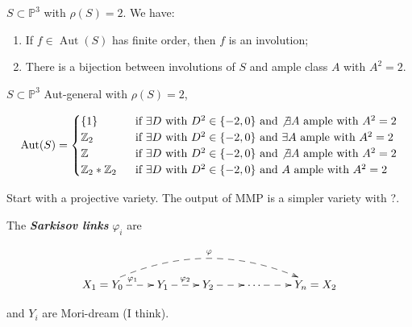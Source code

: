 \begin{proposition}
\label{proposition-paiva-2}
$S \subset \mathbb{P}^3$ with $\rho(S)=2$. We
have:
\begin{enumerate}
\item  If $f \in \operatorname{Aut}(S)$ has
finite order, then $f$ is an involution;
\item There is a bijection between
involutions of $S$ and ample class $A$ with
$A^2=2.$
\end{enumerate}
\end{proposition}

\begin{proposition}
\label{proposition-paiva-3}
$S \subset \mathbb{P}^3$ Aut-general with
$\rho(S)=2$,

$$
\operatorname{Aut}(S)=\begin{cases}
\{1\}\qquad & \text{ if $\exists D$ with $D^2
\in \{-2,0\}$ and $\not\exists  A$ ample with
$A^2=2$} \\
\mathbb{Z}_2\qquad &\text{ if $\exists D$
with $D^2 \in \{-2,0\}$ and $\exists  A$
ample with $A^2=2$}\\
\mathbb{Z} & \text{ if $\exists D$ with $D^2
\in \{-2,0\}$ and $\not\exists  A$ ample with
$A^2=2$}\\
\mathbb{Z}_2 * \mathbb{Z}_2 & \text{ if
$\exists D$ with $D^2 \in \{-2,0\}$ and $ A$
ample with $A^2=2$}
\end{cases}
$$

\end{proposition}

\medskip{}

Start with a projective variety. The output
of MMP is a simpler variety with ?.

\begin{theorem}
\label{theorem-paiva-3}
The  \textit{\textbf{Sarkisov links}}
$\varphi_i$ are

$$
\xymatrix{X_1=Y_0\ar@{-->}[r]^{\varphi_1}
\ar@/^2pc/@{-->}[rrrr]^{\varphi}&Y_1
\ar@{-->}[r]^{\varphi_2}&Y_2\ar@{-->}[r]&
\cdots\ar@{-->}[r]&Y_n=X_2}
$$

and $Y_i$ are Mori-dream (I think).
\end{theorem}

\begin{definition}
\label{definition-paiva-2}
\end{definition}

\begin{definition}
\label{definition-paiva-3}
\end{definition}

